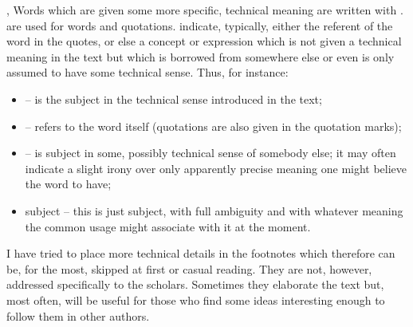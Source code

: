 \sep
Words which are given some more specific, technical meaning are 
written with .  are used for 
words and quotations.  indicate, 
typically, either the referent of the word in the quotes, or else a 
concept or expression which is not given a technical meaning in the 
text but which is borrowed from somewhere else or even is only 
assumed to have some technical sense. Thus, for instance:
\begin{itemize}
\item 
{} -- is the subject in the technical sense introduced in
the text;
\item 
{} -- refers to the word itself (quotations are also given
in the quotation marks);
\item 
{} -- is subject in some, possibly technical sense of
somebody else; it may often indicate a slight irony over only apparently
precise meaning one might believe the word  to have;
\item 
subject -- this is just subject, with full ambiguity and with whatever meaning
the common usage might associate with it at the moment. 
\end{itemize}
I have tried to place more technical details in the footnotes which therefore
can be, for the most, skipped at first or casual reading. They are not, however,
addressed specifically to the scholars. Sometimes they elaborate the text but,
most often, will be useful for those who find some ideas interesting enough to
follow them in other authors.

